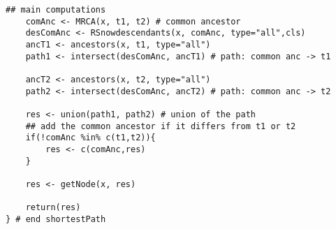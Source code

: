 \documentclass[11pt,letterpaper]{article}
\begin{document}
\begin{lstlisting}[style=MyR]
    ## main computations
    comAnc <- MRCA(x, t1, t2) # common ancestor
    desComAnc <- RSnowdescendants(x, comAnc, type="all",cls)
    ancT1 <- ancestors(x, t1, type="all")
    path1 <- intersect(desComAnc, ancT1) # path: common anc -> t1

    ancT2 <- ancestors(x, t2, type="all")
    path2 <- intersect(desComAnc, ancT2) # path: common anc -> t2

    res <- union(path1, path2) # union of the path
    ## add the common ancestor if it differs from t1 or t2
    if(!comAnc %in% c(t1,t2)){
        res <- c(comAnc,res)
    }

    res <- getNode(x, res)

    return(res)
} # end shortestPath

\end{lstlisting}
\end{document}
